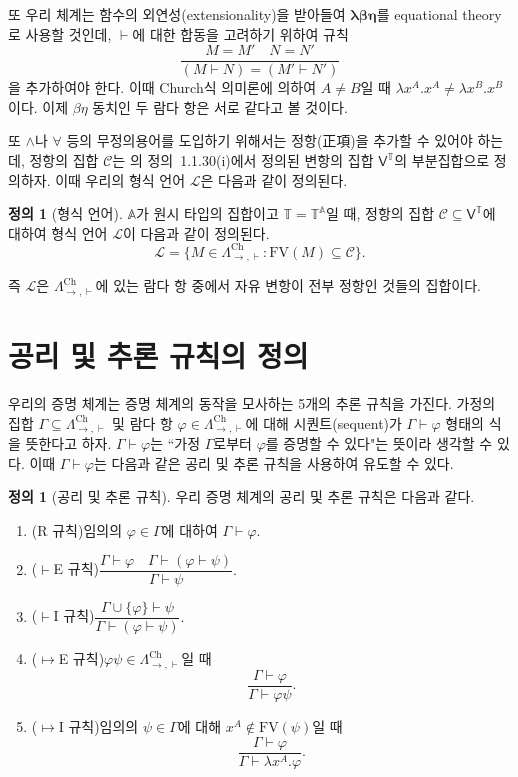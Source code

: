 \documentclass[10pt,twocolumn]{article}
\theoremstyle{definition}
\newtheorem{definition}[theorem]{정의}
\newcommand{\Lchh}{\Lambda_{\to,\vdash}^{\text{Ch}}}
\begin{document}
또 우리 체계는 함수의 외연성(extensionality)을 받아들여 $\bm{\lambda\beta\eta}$를 equational theory로 사용할 것인데, $\vdash$에 대한 합동을 고려하기 위하여 규칙
$$\dfrac{M=M'\quad N=N'}{(M\vdash N)=(M'\vdash N')}$$
을 추가하여야 한다. 이때 Church식 의미론에 의하여 $A\ne B$일 때 $\lambda x^A.x^A\ne\lambda x^B.x^B$이다. 이제 $\beta\eta$ 동치인 두 람다 항은 서로 같다고 볼 것이다.

또 $\land$나 $\forall$ 등의 무정의용어를 도입하기 위해서는 정항(正項)을 추가할 수 있어야 하는데, 정항의 집합 $\mathcal C$는 \cite{luswt}의 정의~1.1.30(i)에서 정의된 변항의 집합 $\mathsf V^{\mathds T}$의 부분집합으로 정의하자. 이때 우리의 형식 언어 $\mathcal L$은 다음과 같이 정의된다.

\begin{definition}[형식 언어]
	$\mathbb A$가 원시 타입의 집합이고 $\mathds T = \mathds T^{\mathbb A}$일 때, 정항의 집합 $\mathcal C\subseteq \mathsf V^{\mathds T}$에 대하여 형식 언어 $\mathcal L$이 다음과 같이 정의된다.
	$$\mathcal L = \{M\in\Lchh: \mathrm{FV}(M)\subseteq\mathcal C\}.$$
\end{definition}

즉 $\mathcal L$은 $\Lchh$에 있는 람다 항 중에서 자유 변항이 전부 정항인 것들의 집합이다.

\section{공리 및 추론 규칙의 정의}

우리의 증명 체계는 증명 체계의 동작을 모사하는 5개의 추론 규칙을 가진다. 가정의 집합 $\Gamma\subseteq\Lchh$ 및 람다 항 $\varphi\in\Lchh$에 대해 시퀀트(sequent)가 $\Gamma\vdash\varphi$ 형태의 식을 뜻한다고 하자. $\Gamma\vdash\varphi$는 ``가정 $\Gamma$로부터 $\varphi$를 증명할 수 있다"는 뜻이라 생각할 수 있다. 이때 $\Gamma\vdash\varphi$는 다음과 같은 공리 및 추론 규칙을 사용하여 유도할 수 있다.

\begin{definition}[공리 및 추론 규칙]
	우리 증명 체계의 공리 및 추론 규칙은 다음과 같다.
	
	\begin{enumerate}
		\item (R 규칙)\quad 임의의 $\varphi\in\Gamma$에 대하여 $\Gamma\vdash\varphi.$
		\item ($\vdash$E 규칙)\quad $\dfrac{\Gamma\vdash\varphi\quad\Gamma\vdash(\varphi\vdash\psi)}{\Gamma\vdash\psi}.$
		\item ($\vdash$I 규칙)\quad $\dfrac{\Gamma\cup\{\varphi\}\vdash\psi}{\Gamma\vdash(\varphi\vdash\psi)}.$
		\item ($\mapsto$E 규칙)\quad $\varphi\psi\in\Lchh$일 때 $$\dfrac{\Gamma\vdash\varphi}{\Gamma\vdash\varphi\psi}.$$
		\item ($\mapsto$I 규칙)\quad 임의의 $\psi\in\Gamma$에 대해 $x^A\notin\mathrm{FV}(\psi)$일 때 $$\dfrac{\Gamma\vdash\varphi}{\Gamma\vdash\lambda x^A.\varphi}.$$
	\end{enumerate}
\end{definition}
\end{document}

